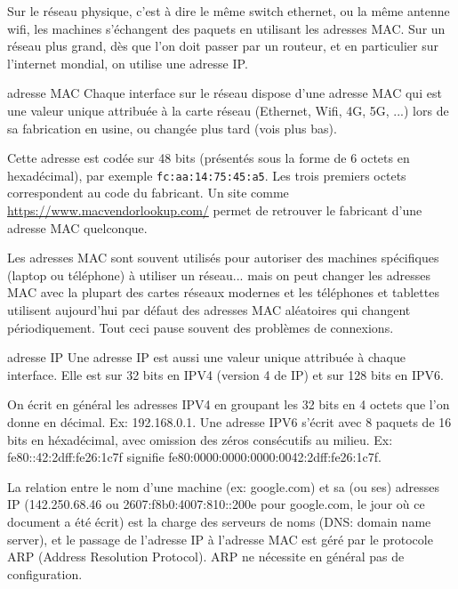 \documentclass[a4paper,dvipsnames]{article}
\begin{document}
Sur le réseau physique, c'est à dire le même switch ethernet, ou la même antenne
wifi, les machines s'échangent
des paquets en utilisant les adresses MAC. Sur un réseau plus grand, dès que
l'on
doit passer par un routeur, et en particulier sur l'internet mondial, on utilise
une adresse IP.

\begin{definition}[breakable]{adresse MAC}{}
  Chaque interface sur le réseau dispose d'une adresse MAC qui est une valeur
  unique attribuée à la carte réseau (Ethernet, Wifi, 4G, 5G, ...) lors de sa
  fabrication en usine, ou changée plus tard (vois plus bas).

  \smallskip

  Cette adresse est codée sur 48 bits (présentés sous la forme de 6 octets en
  hexadécimal), par exemple \texttt{fc:aa:14:75:45:a5}. Les trois premiers
  octets correspondent au code du fabricant. Un site comme
  \url{https://www.macvendorlookup.com/} permet de retrouver le fabricant d'une
  adresse MAC quelconque.

  Les adresses MAC sont souvent utilisés pour autoriser des machines spécifiques
  (laptop ou téléphone) à utiliser un réseau... mais on peut changer les
  adresses MAC avec la plupart des cartes réseaux modernes et les téléphones et
  tablettes utilisent aujourd'hui par défaut des adresses MAC aléatoires qui
  changent périodiquement. Tout ceci pause souvent des problèmes de connexions.
\end{definition}

\begin{definition}[breakable]{adresse IP}{}
  Une adresse IP est aussi une valeur unique attribuée à chaque interface.  Elle
  est sur 32 bits en IPV4 (version 4 de IP) et sur 128 bits en IPV6.

  On écrit en général les adresses IPV4 en groupant les 32 bits en 4 octets que
  l'on donne en décimal. Ex: 192.168.0.1. Une adresse IPV6 s'écrit avec 8 paquets de
  16 bits en héxadécimal, avec omission des zéros consécutifs au milieu.
  Ex: fe80::42:2dff:fe26:1c7f signifie fe80:0000:0000:0000:0042:2dff:fe26:1c7f.

  La relation entre le nom d'une machine (ex: google.com) et sa (ou ses)
  adresses IP (142.250.68.46 ou 2607:f8b0:4007:810::200e pour google.com, le
  jour où ce document a été écrit)
  est la
  charge des serveurs de noms (DNS: domain name server), et le passage de
  l'adresse IP à l'adresse MAC est géré par le protocole ARP (Address Resolution
  Protocol). ARP ne
  nécessite en général pas de configuration.
\end{definition}
\end{document}
